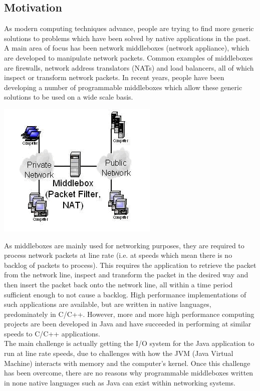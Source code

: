 \documentclass[a4paper, titlepage]{article}
\begin{document}
\subsection{Motivation}
As modern computing techniques advance, people are trying to find more generic solutions to problems which have been solved by native applications in the past. A main area of focus has been network middleboxes (network appliance), which are developed to manipulate network packets. Common examples of middleboxes are firewalls, network address translators (NATs) and load balancers, all of which inspect or transform network packets. In recent years, people have been developing a number of programmable middleboxes which allow these generic solutions to be used on a wide scale basis.

\begin{center}
	\includegraphics[scale=0.75]{images/middleboxes.jpg}
\end{center}

As middleboxes are mainly used for networking purposes, they are required to process network packets at line rate (i.e. at speeds which mean there is no backlog of packets to process). This requires the application to retrieve the packet from the network line, inspect and transform the packet in the desired way and then insert the packet back onto the network line, all within a time period sufficient enough to not cause a backlog. High performance implementations of such applications are available, but are written in native languages, predominately in C/C++. However, more and more high performance computing projects are been developed in Java and have succeeded in performing at similar speeds to C/C++ applications. \\
\newline
The main challenge is actually getting the I/O system for the Java application to run at line rate speeds, due to challenges with how the JVM (Java Virtual Machine) interacts with memory and the computer's kernel. Once this challenge has been overcome, there are no reasons why programmable middleboxes written in none native languages such as Java can exist within networking systems.
\end{document}
